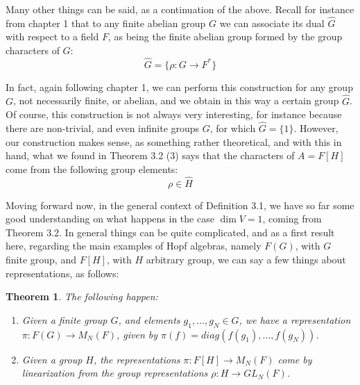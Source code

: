 \documentclass[12pt]{amsbook}
\newtheorem{theorem}{Theorem}[chapter]
\begin{document}
Many other things can be said, as a continuation of the above. Recall for instance from chapter 1 that to any finite abelian group $G$ we can associate its dual $\widehat{G}$ with respect to a field $F$, as being the finite abelian group formed by the group characters of $G$:
$$\widehat{G}=\Big\{\rho:G\to F^*\Big\}$$

In fact, again following chapter 1, we can perform this construction for any group $G$, not necessarily finite, or abelian, and we obtain in this way a certain group $\widehat{G}$. Of course, this construction is not always very interesting, for instance because there are non-trivial, and even infinite groups $G$, for which $\widehat{G}=\{1\}$. However, our construction makes sense, as something rather theoretical, and with this in hand, what we found in Theorem 3.2 (3) says that the characters of $A=F[H]$ come from the following group elements:
$$\rho\in\widehat{H}$$

Moving forward now, in the general context of Definition 3.1, we have so far some good understanding on what happens in the case $\dim V=1$, coming from Theorem 3.2. In general things can be quite complicated, and as a first result here, regarding the main examples of Hopf algebras, namely $F(G)$, with $G$ finite group, and $F[H]$, with $H$ arbitrary group, we can say a few things about representations, as follows: 

\begin{theorem}
The following happen:
\begin{enumerate}
\item Given a finite group $G$, and elements $g_1,\ldots,g_N\in G$, we have a representation $\pi:F(G)\to M_N(F)$, given by $\pi(f)=diag(f(g_1),\ldots,f(g_N))$.

\item Given a group $H$, the representations $\pi:F[H]\to M_N(F)$ come by linearization from the group representations $\rho:H\to GL_N(F)$.
\end{enumerate}
\end{theorem}
\end{document}
